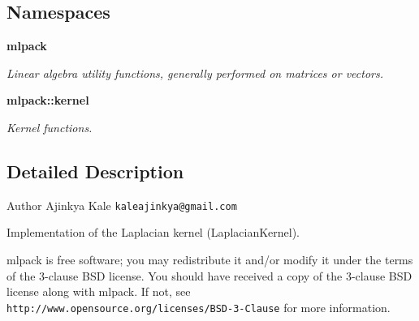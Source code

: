 \subsection*{Namespaces}
\begin{DoxyCompactItemize}
\item 
 {\bf mlpack}
\begin{DoxyCompactList}\small\item\em Linear algebra utility functions, generally performed on matrices or vectors. \end{DoxyCompactList}\item 
 {\bf mlpack\+::kernel}
\begin{DoxyCompactList}\small\item\em Kernel functions. \end{DoxyCompactList}\end{DoxyCompactItemize}


\subsection{Detailed Description}
\begin{DoxyAuthor}{Author}
Ajinkya Kale {\tt kaleajinkya@gmail.\+com}
\end{DoxyAuthor}
Implementation of the Laplacian kernel (Laplacian\+Kernel).

mlpack is free software; you may redistribute it and/or modify it under the terms of the 3-\/clause B\+SD license. You should have received a copy of the 3-\/clause B\+SD license along with mlpack. If not, see {\tt http\+://www.\+opensource.\+org/licenses/\+B\+S\+D-\/3-\/\+Clause} for more information. 